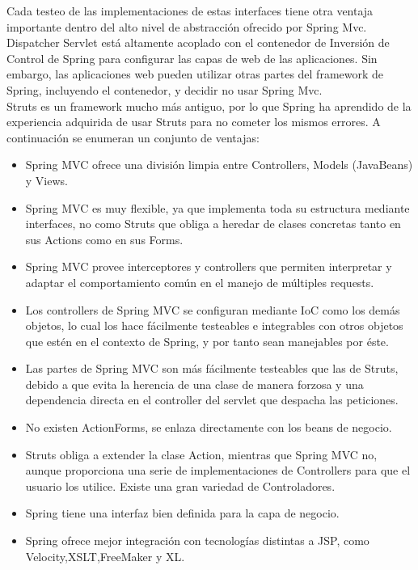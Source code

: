 \begin{itemize}
			Cada testeo de las implementaciones de estas interfaces tiene otra ventaja importante dentro del alto nivel de abstracción ofrecido por Spring Mvc. Dispatcher Servlet está altamente acoplado con el contenedor de Inversión de Control de Spring para configurar las capas de web de las aplicaciones. Sin embargo, las aplicaciones web pueden utilizar otras partes del framework de Spring, incluyendo el contenedor, y decidir no usar Spring Mvc. \cite{MVC}\\
			Struts es un framework mucho más antiguo, por lo que Spring ha aprendido de la experiencia adquirida de usar Struts para no cometer los mismos errores. \cite{introspring}
			A continuación se enumeran un conjunto de ventajas:
			\begin{itemize}
				\item Spring MVC ofrece una división limpia entre Controllers, Models (JavaBeans) y Views. 
				\item Spring MVC es muy flexible, ya que implementa toda su estructura mediante interfaces, no como Struts que obliga a heredar de clases concretas tanto en sus Actions como en sus Forms. 
				\item Spring MVC provee interceptores y controllers que permiten interpretar y adaptar el comportamiento común en el manejo de múltiples requests.
				\item Los controllers de Spring MVC se configuran mediante IoC como los demás objetos, lo cual los hace fácilmente testeables e integrables con otros objetos que estén en el contexto de Spring, y por tanto sean manejables por éste. 
				\item Las partes de Spring MVC son más fácilmente testeables que las de Struts, debido a que evita la herencia de una clase de manera forzosa y una dependencia directa en el controller del servlet que despacha las peticiones. 
				\item No existen ActionForms, se enlaza directamente con los beans de negocio. 
				\item Struts obliga a extender la clase Action, mientras que Spring MVC no, aunque proporciona una serie de implementaciones de Controllers para que el usuario los utilice. Existe una gran variedad de Controladores.
				\item Spring tiene una interfaz bien definida para la capa de negocio. 
				\item Spring ofrece mejor integración con tecnologías distintas a JSP, como Velocity,XSLT,FreeMaker y XL. 
			\end{itemize}

\end{itemize}
